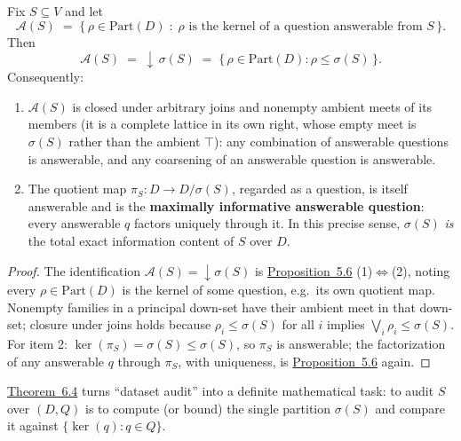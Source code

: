 
\begin{thmplain}

Fix \(S \subseteq V\) and let
\[
\mathcal{A}(S) \;=\; \{\, \rho \in \mathrm{Part}(D) \;:\; \rho \text{ is the kernel of a question answerable from } S \,\}.
\]
Then
\[
\mathcal{A}(S) \;=\; {\downarrow}\,\sigma(S) \;=\; \{\, \rho \in \mathrm{Part}(D) : \rho \le \sigma(S) \,\}.
\]
Consequently:

\begin{enumerate}
\def\labelenumi{\arabic{enumi}.}
\tightlist
\item
  \(\mathcal{A}(S)\) is closed under arbitrary joins and nonempty ambient meets of its members (it is a complete lattice in its own right, whose empty meet is \(\sigma(S)\) rather than the ambient \(\top\)): any combination of answerable questions is answerable, and any coarsening of an answerable question is answerable.
\item
  The quotient map \(\pi_S : D \to D/\sigma(S)\), regarded as a question, is itself answerable and is the \textbf{maximally informative answerable question}: every answerable \(q\) factors uniquely through it. In this precise sense, \(\sigma(S)\) \emph{is} the total exact information content of \(S\) over \(D\).
\end{enumerate}
\end{thmplain}

\begin{proof}

The identification \(\mathcal{A}(S) = {\downarrow}\sigma(S)\) is \hyperlink{stmt:5.6}{Proposition~5.6} (1)\(\iff\)(2), noting every \(\rho \in \mathrm{Part}(D)\) is the kernel of some question, e.g.~its own quotient map. Nonempty families in a principal down-set have their ambient meet in that down-set; closure under joins holds because \(\rho_i \le \sigma(S)\) for all \(i\) implies \(\bigvee_i \rho_i \le \sigma(S)\). For item 2: \(\ker(\pi_S) = \sigma(S) \le \sigma(S)\), so \(\pi_S\) is answerable; the factorization of any answerable \(q\) through \(\pi_S\), with uniqueness, is \hyperlink{stmt:5.6}{Proposition~5.6} again.
\end{proof}

\hyperlink{stmt:6.4}{Theorem~6.4} turns ``dataset audit'' into a definite mathematical task: to audit \(S\) over \((D, Q)\) is to compute (or bound) the single partition \(\sigma(S)\) and compare it against \(\{\ker(q) : q \in Q\}\).

